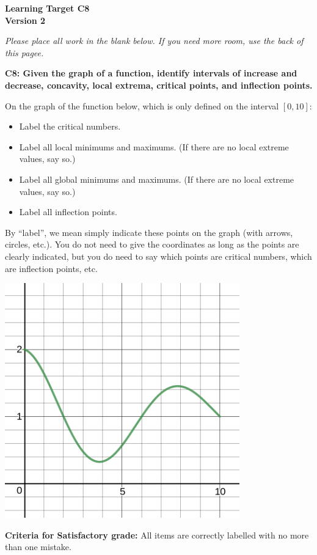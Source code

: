 \documentclass[10pt]{article}
\begin{document}
	\vspace*{0in}

		\begin{center}
			\textbf{Learning Target C8 \\
			Version 2}
		\end{center}

\emph{Please place all work in the blank below. If you need more room, use the back of this pagee.}

\begin{framed}
	\textbf{C8: Given the graph of a function, identify intervals of increase and decrease, concavity, local extrema, critical points, and inflection points. }
\end{framed}


On the graph of the function below, which is only defined on the interval $[0,10]$: 

\begin{itemize}
    \item Label the critical numbers. 
    \item Label all local minimums and maximums. (If there are no local extreme values, say so.) 
    \item Label all global minimums and maximums. (If there are no local extreme values, say so.) 
    \item Label all inflection points. 
\end{itemize}
By ``label'', we mean simply indicate these points on the graph (with arrows, circles, etc.). You do not need to give the coordinates as long as the points are clearly indicated, but you do need to say which points are critical numbers, which are inflection points, etc. 

\begin{center}
    \includegraphics[width=4in]{ltc8-v2.png}
\end{center}

\vfill

\begin{small}
    \begin{framed}
        	\textbf{Criteria for Satisfactory grade:} All items are correctly labelled with no more than one mistake. 
    \end{framed}

\end{small}
\end{document}
